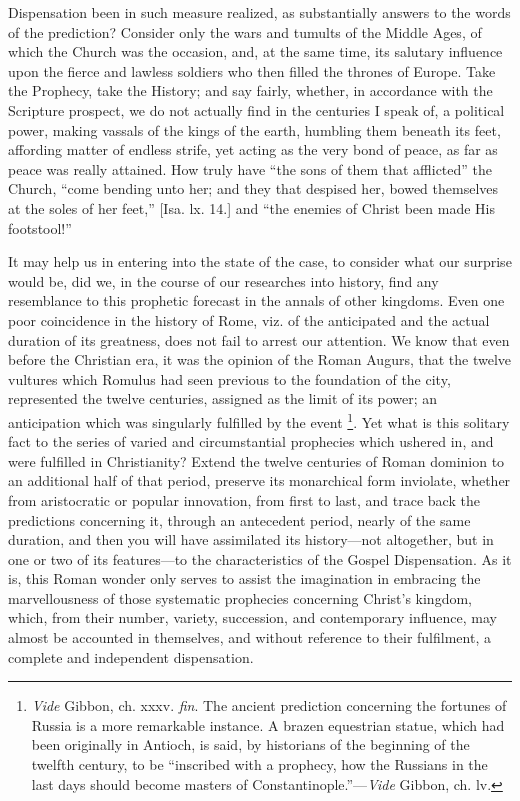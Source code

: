 Dispensation been in such measure realized, as substantially answers to
the words of the prediction? Consider only the wars and tumults of the
Middle Ages, of which the Church was the occasion, and, at the same
time, its salutary influence upon the fierce and lawless soldiers who
then filled the thrones of Europe. Take the Prophecy, take the History;
and say fairly, whether, in accordance with the Scripture prospect, we
do not actually find in the centuries I speak of, a political power,
making vassals of the kings of the earth, humbling them beneath its
feet, affording matter of endless strife, yet acting as the very bond of
peace, as far as peace was really attained. How truly have ``the
sons of them that afflicted'' the Church, ``come bending unto
her; and they that despised her, bowed themselves at the soles of her
feet,'' [Isa. lx. 14.] and ``the enemies of Christ been made His
footstool!''

It may help us in entering into the state of the case, to consider
what our surprise would be, did we, in the course of our researches into
history, find any resemblance to this prophetic forecast in the annals
of other kingdoms. Even one poor coincidence in the history of Rome,
viz. of the anticipated and the actual duration of its greatness, does
not fail to arrest our attention. We know that even before the Christian
era, it was the opinion of the Roman Augurs, that the twelve vultures
which Romulus had seen previous to the foundation of the city,
represented the twelve centuries, assigned as the limit of its power; an
anticipation which was singularly fulfilled by the event \footnote{\emph{Vide} Gibbon, ch. xxxv. \emph{fin}. The
ancient prediction concerning the fortunes of Russia is a more
remarkable instance. A brazen equestrian statue, which had been
originally in Antioch, is said, by historians of the beginning of the
twelfth century, to be ``inscribed with a prophecy, how the Russians
in the last days should become masters of Constantinople.''—\emph{Vide}
Gibbon, ch. lv.}. Yet what is this solitary fact to the series of varied and
circumstantial prophecies which ushered in, and were fulfilled in
Christianity? Extend the twelve centuries of Roman dominion to an
additional half of that period, preserve its monarchical form inviolate,
whether from aristocratic or popular innovation, from first to last, and
trace back the predictions concerning it, through an antecedent period,
nearly of the same duration, and then you will have assimilated its
history—not altogether, but in one or two of its features—to the
characteristics of the Gospel Dispensation. As it is, this Roman wonder
only serves to assist the imagination in embracing the marvellousness of
those systematic prophecies concerning Christ's kingdom, which, from
their number, variety, succession, and contemporary influence, may
almost be accounted in themselves, and without reference to their
fulfilment, a complete and independent dispensation.

